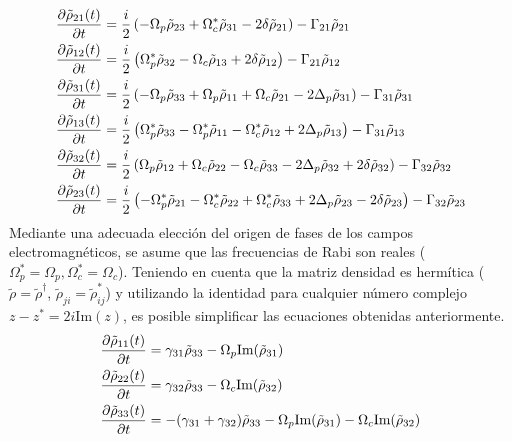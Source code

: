 \begin{equation}
    \begin{split}
        \pdv{\tilde{\rho}_{21}(t)}{t} &= \frac{i}{2} \left(-\Omega_p \tilde{\rho}_{23} + \Omega_c^* \tilde{\rho}_{31} - 2 \delta \tilde{\rho}_{21} \right) -\Gamma_{21} \tilde{\rho}_{21}\\
        \pdv{\tilde{\rho}_{12}(t)}{t} &= \frac{i}{2} \left( \Omega_p^* \tilde{\rho}_{32} - \Omega_c \tilde{\rho}_{13} + 2 \delta \tilde{\rho}_{12} \right) -\Gamma_{21} \tilde{\rho}_{12}\\
        \pdv{\tilde{\rho}_{31}(t)}{t} &= \frac{i}{2} \left( -\Omega_p \tilde{\rho}_{33} + \Omega_p \tilde{\rho}_{11} + \Omega_c \tilde{\rho}_{21} - 2 \Delta_p \tilde{\rho}_{31}  \right) -\Gamma_{31} \tilde{\rho}_{31} \\
        \pdv{\tilde{\rho}_{13}(t)}{t} &= \frac{i}{2} \left( \Omega_p^* \tilde{\rho}_{33} -\Omega_p^* \tilde{\rho}_{11} - \Omega_c^* \tilde{\rho}_{12} + 2 \Delta_p \tilde{\rho}_{13} \right) -\Gamma_{31} \tilde{\rho}_{13} \\
        \pdv{\tilde{\rho}_{32}(t)}{t} &= \frac{i}{2} \left( \Omega_p \tilde{\rho}_{12} + \Omega_c \tilde{\rho}_{22} - \Omega_c \tilde{\rho}_{33} - 2 \Delta_p \tilde{\rho}_{32} + 2 \delta \tilde{\rho}_{32}  \right) -\Gamma_{32} \tilde{\rho}_{32}\\
        \pdv{\tilde{\rho}_{23}(t)}{t} &= \frac{i}{2} \left(-\Omega_p^* \tilde{\rho}_{21} - \Omega_c^* \tilde{\rho}_{22} + \Omega_c^* \tilde{\rho}_{33} + 2 \Delta_p \tilde{\rho}_{23} - 2 \delta \tilde{\rho}_{23} \right) -\Gamma_{32} \tilde{\rho}_{23}
    \end{split}
\end{equation}
Mediante una adecuada elección del origen de fases de los campos electromagnéticos, se asume que las frecuencias de Rabi son reales ($\Omega_p^* = \Omega_p, \Omega_c^* = \Omega_c$). Teniendo en cuenta que la matriz densidad es hermítica ($\tilde{\rho} = \tilde{\rho}^\dagger$, $\tilde{\rho}_{ji} = \tilde{\rho}_{ij}^*$) y utilizando la identidad para cualquier número complejo $z - z^* = 2i \text{Im}(z)$, es posible simplificar las ecuaciones obtenidas anteriormente.
\begin{equation}
    \begin{split}
        \pdv{\tilde{\rho}_{11}(t)}{t} &= \gamma_{31} \tilde{\rho}_{33} - \Omega_p \text{Im}(\tilde{\rho}_{31})\\
        \pdv{\tilde{\rho}_{22}(t)}{t} &= \gamma_{32} \tilde{\rho}_{33} - \Omega_c \text{Im}(\tilde{\rho}_{32})\\
        \pdv{\tilde{\rho}_{33}(t)}{t} &= - (\gamma_{31} + \gamma_{32}) \tilde{\rho}_{33}  - \Omega_p \text{Im}(\tilde{\rho}_{31}) - \Omega_c \text{Im}(\tilde{\rho}_{32})
    \end{split}
\end{equation}

